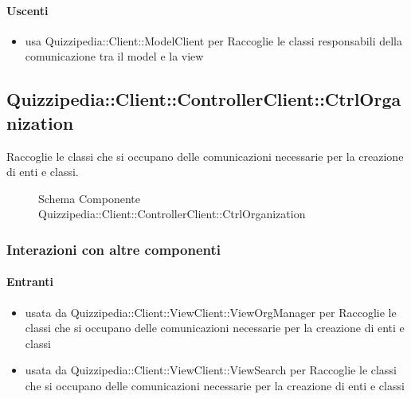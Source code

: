 \paragraph{Uscenti}
\begin{itemize}
\item usa Quizzipedia::Client::ModelClient per Raccoglie le classi responsabili della comunicazione tra il model e la view
\end{itemize}
\subsection{Quizzipedia::Client::ControllerClient::CtrlOrganization}
Raccoglie le classi che si occupano delle comunicazioni necessarie per la creazione di enti e classi.
\begin{figure}[H]
\centering
\noindent{}
\caption[Schema Componente Quizzipedia::Client::ControllerClient::CtrlOrganization]{Schema Componente Quizzipedia::Client::ControllerClient::CtrlOrganization}
\end{figure}
\subsubsection{Interazioni con altre componenti}
\paragraph{Entranti}
\begin{itemize}
\item usata da Quizzipedia::Client::ViewClient::ViewOrgManager per Raccoglie le classi che si occupano delle comunicazioni necessarie per la creazione di enti e classi
\item usata da Quizzipedia::Client::ViewClient::ViewSearch per Raccoglie le classi che si occupano delle comunicazioni necessarie per la creazione di enti e classi
\end{itemize}
